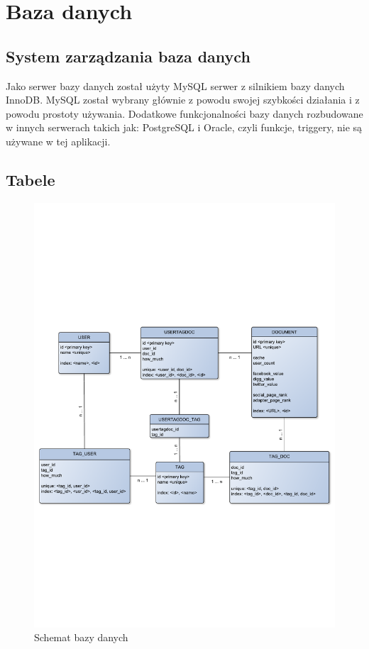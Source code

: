 \documentclass[11pt,a4paper]{report}
\begin{document}
\tableofcontents


\chapter{Baza danych}

\section{System zarządzania baza danych}

Jako serwer bazy danych został użyty MySQL serwer z silnikiem bazy danych InnoDB. MySQL został wybrany głównie z powodu swojej szybkości działania i z powodu prostoty używania. Dodatkowe funkcjonalności bazy danych rozbudowane w innych serwerach takich jak: PostgreSQL i Oracle, czyli funkcje, triggery, nie są używane w tej aplikacji. 

\section{Tabele}


\begin{figure}[htb]
\centering
\includegraphics[width=1\textwidth]{database.pdf}
\caption{Schemat bazy danych}
\label{fig:db_fig}
\end{figure}
\end{document}
